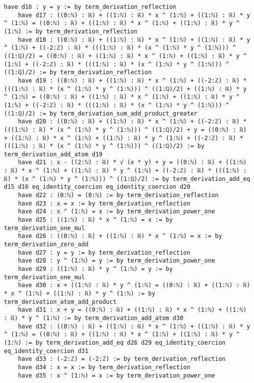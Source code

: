 \documentclass{article}
\begin{document}
\begin{tcolorbox}[colback=white!10, width=\linewidth]
\begin{lstlisting}[language=Lean4]
    have d16 : y = y := by term_derivation_reflection
    have d17 : ((0:ℕ) : ℝ) + ((1:ℕ) : ℝ) * x ^ (1:ℕ) + ((1:ℕ) : ℝ) * y ^ (1:ℕ) = ((0:ℕ) : ℝ) + ((1:ℕ) : ℝ) * x ^ (1:ℕ) + ((1:ℕ) : ℝ) * y ^ (1:ℕ) := by term_derivation_reflection
    have d18 : ((0:ℕ) : ℝ) + ((1:ℕ) : ℝ) * x ^ (1:ℕ) + ((1:ℕ) : ℝ) * y ^ (1:ℕ) + ((-2:ℤ) : ℝ) * (((1:ℕ) : ℝ) * (x ^ (1:ℕ) * y ^ (1:ℕ))) ^ ((1:ℚ)/2) = ((0:ℕ) : ℝ) + ((1:ℕ) : ℝ) * x ^ (1:ℕ) + ((1:ℕ) : ℝ) * y ^ (1:ℕ) + ((-2:ℤ) : ℝ) * (((1:ℕ) : ℝ) * (x ^ (1:ℕ) * y ^ (1:ℕ))) ^ ((1:ℚ)/2) := by term_derivation_reflection
    have d19 : ((0:ℕ) : ℝ) + ((1:ℕ) : ℝ) * x ^ (1:ℕ) + ((-2:ℤ) : ℝ) * (((1:ℕ) : ℝ) * (x ^ (1:ℕ) * y ^ (1:ℕ))) ^ ((1:ℚ)/2) + ((1:ℕ) : ℝ) * y ^ (1:ℕ) = ((0:ℕ) : ℝ) + ((1:ℕ) : ℝ) * x ^ (1:ℕ) + ((1:ℕ) : ℝ) * y ^ (1:ℕ) + ((-2:ℤ) : ℝ) * (((1:ℕ) : ℝ) * (x ^ (1:ℕ) * y ^ (1:ℕ))) ^ ((1:ℚ)/2) := by term_derivation_sum_add_product_greater
    have d20 : ((0:ℕ) : ℝ) + ((1:ℕ) : ℝ) * x ^ (1:ℕ) + ((-2:ℤ) : ℝ) * (((1:ℕ) : ℝ) * (x ^ (1:ℕ) * y ^ (1:ℕ))) ^ ((1:ℚ)/2) + y = ((0:ℕ) : ℝ) + ((1:ℕ) : ℝ) * x ^ (1:ℕ) + ((1:ℕ) : ℝ) * y ^ (1:ℕ) + ((-2:ℤ) : ℝ) * (((1:ℕ) : ℝ) * (x ^ (1:ℕ) * y ^ (1:ℕ))) ^ ((1:ℚ)/2) := by term_derivation_add_atom d19
    have d21 : x - ((2:ℕ) : ℝ) * √ (x * y) + y = ((0:ℕ) : ℝ) + ((1:ℕ) : ℝ) * x ^ (1:ℕ) + ((1:ℕ) : ℝ) * y ^ (1:ℕ) + ((-2:ℤ) : ℝ) * (((1:ℕ) : ℝ) * (x ^ (1:ℕ) * y ^ (1:ℕ))) ^ ((1:ℚ)/2) := by term_derivation_add_eq d15 d16 eq_identity_coercion eq_identity_coercion d20
    have d22 : (0:ℕ) = (0:ℕ) := by term_derivation_reflection
    have d23 : x = x := by term_derivation_reflection
    have d24 : x ^ (1:ℕ) = x := by term_derivation_power_one
    have d25 : ((1:ℕ) : ℝ) * x ^ (1:ℕ) = x := by term_derivation_one_mul
    have d26 : ((0:ℕ) : ℝ) + ((1:ℕ) : ℝ) * x ^ (1:ℕ) = x := by term_derivation_zero_add
    have d27 : y = y := by term_derivation_reflection
    have d28 : y ^ (1:ℕ) = y := by term_derivation_power_one
    have d29 : ((1:ℕ) : ℝ) * y ^ (1:ℕ) = y := by term_derivation_one_mul
    have d30 : x + ((1:ℕ) : ℝ) * y ^ (1:ℕ) = ((0:ℕ) : ℝ) + ((1:ℕ) : ℝ) * x ^ (1:ℕ) + ((1:ℕ) : ℝ) * y ^ (1:ℕ) := by term_derivation_atom_add_product
    have d31 : x + y = ((0:ℕ) : ℝ) + ((1:ℕ) : ℝ) * x ^ (1:ℕ) + ((1:ℕ) : ℝ) * y ^ (1:ℕ) := by term_derivation_add_atom d30
    have d32 : ((0:ℕ) : ℝ) + ((1:ℕ) : ℝ) * x ^ (1:ℕ) + ((1:ℕ) : ℝ) * y ^ (1:ℕ) = ((0:ℕ) : ℝ) + ((1:ℕ) : ℝ) * x ^ (1:ℕ) + ((1:ℕ) : ℝ) * y ^ (1:ℕ) := by term_derivation_add_eq d26 d29 eq_identity_coercion eq_identity_coercion d31
    have d33 : (-2:ℤ) = (-2:ℤ) := by term_derivation_reflection
    have d34 : x = x := by term_derivation_reflection
    have d35 : x ^ (1:ℕ) = x := by term_derivation_power_one

\end{lstlisting}
\end{tcolorbox}
\end{document}
